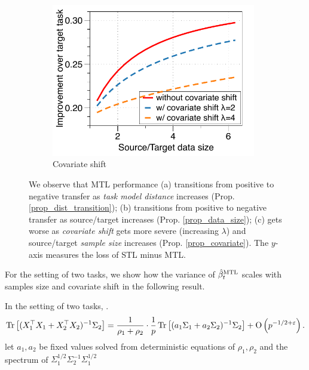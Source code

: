 \begin{figure}[!t]
\begin{subfigure}[b]{0.32\textwidth}
		\centering
		\includegraphics[width=0.98\textwidth]{figures/complementary.pdf}
		\vspace{-0.075in}
		\caption{Covariate shift}
		\label{fig_covariate}
	\end{subfigure}
	\caption{%
	We observe that MTL performance
	(a) transitions from positive to negative transfer as \textit{task model distance} increases (Prop. \ref{prop_dist_transition});
	(b) transitions from positive to negative transfer as source/target  increases (Prop. \ref{prop_data_size});
	(c) gets worse as \textit{covariate shift} gets more severe (increasing $\lambda$) and source/target \textit{sample size} increases (Prop. \ref{prop_covariate}).
	The $y$-axis measures the loss of STL minus MTL.}
	\label{fig_model_shift_phasetrans}
	\vspace{-0.1in}
\end{figure}


For the setting of two tasks, we show how the variance of $\hat{\beta}_t^{\text{MTL}}$ scales with samples size and covariate shift in the following result.
\begin{theorem}[Informal]\label{lem_cov_shift_informal}
	In the setting of two tasks, .
	\begin{align}\label{eq_introX1X2}
		\operatorname{Tr}\left[(X_1^{\top}X_1 + X_2^{\top}X_2)^{-1}\Sigma_2\right] = \frac{1}{\rho_1+\rho_2}\cdot \frac1p\operatorname{Tr}\left[ (a_1 \Sigma_1 + a_2\Sigma_2)^{-1} \Sigma_2\right] +\operatorname{O}\left({p^{-1/2+\varepsilon}}\right).
	\end{align}
	let $a_1, a_2$ be fixed values solved from deterministic equations of $\rho_1, \rho_2$ and the spectrum of $\Sigma_1^{1/2}\Sigma_2^{-1}\Sigma_1^{1/2}$
\end{theorem}


